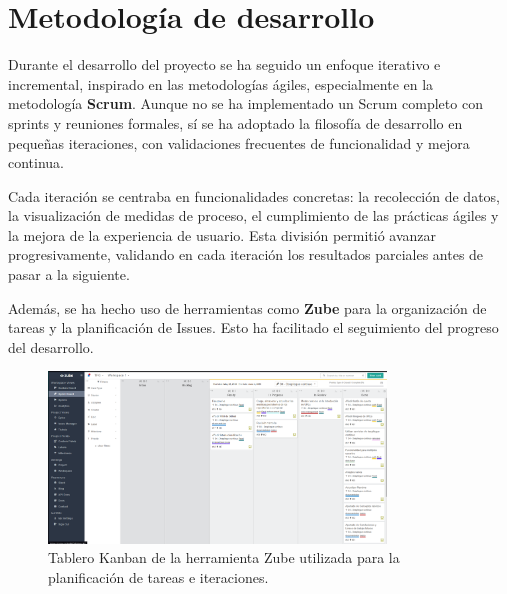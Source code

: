 

\section{Metodología de desarrollo}

Durante el desarrollo del proyecto se ha seguido un enfoque iterativo e incremental, inspirado en las metodologías ágiles, especialmente en la metodología \textbf{Scrum}. Aunque no se ha implementado un Scrum completo con sprints y reuniones formales, sí se ha adoptado la filosofía de desarrollo en pequeñas iteraciones, con validaciones frecuentes de funcionalidad y mejora continua.

Cada iteración se centraba en funcionalidades concretas: la recolección de datos, la visualización de medidas de proceso, el cumplimiento de las prácticas ágiles y la mejora de la experiencia de usuario. Esta división permitió avanzar progresivamente, validando en cada iteración los resultados parciales antes de pasar a la siguiente.

Además, se ha hecho uso de herramientas como \textbf{Zube} para la organización de tareas y la planificación de Issues. Esto ha facilitado el seguimiento del progreso del desarrollo.

\begin{figure}[H]
\centering
\includegraphics[width=0.8\textwidth]{img/IteracionZube.png}
\caption{Tablero Kanban de la herramienta Zube utilizada para la planificación de tareas e iteraciones.}
\label{fig:zube}
\end{figure}


